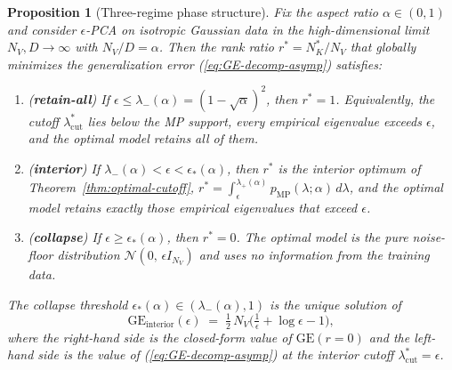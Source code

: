 \documentclass[11pt,a4paper]{article}
\newtheorem{proposition}{Proposition}
\theoremstyle{definition}
\theoremstyle{remark}
\newcommand{\NK}{N_K}
\newcommand{\NV}{N_V}
\begin{document}
\begin{proposition}[Three-regime phase structure]
\label{prop:phase}
Fix the aspect ratio $\alpha \in (0, 1)$ and consider
$\epsilon$-PCA on isotropic Gaussian data in the
high-dimensional limit $\NV, D \to \infty$ with
$\NV/D = \alpha$. Then the rank ratio
$r^{*} = \NK^{*}/\NV$ that globally minimizes the
generalization error (\ref{eq:GE-decomp-asymp}) satisfies:
\begin{enumerate}
\item[(R1)] (\textbf{retain-all}) \;
  If $\epsilon \leq \lambda_{-}(\alpha) = (1-\sqrt{\alpha})^{2}$,
  then $r^{*} = 1$. Equivalently, the cutoff
  $\lambda_{\mathrm{cut}}^{*}$ lies below the MP support, every
  empirical eigenvalue exceeds $\epsilon$, and the optimal model
  retains all of them.
\item[(R2)] (\textbf{interior}) \;
  If $\lambda_{-}(\alpha) < \epsilon < \epsilon_{*}(\alpha)$,
  then $r^{*}$ is the interior optimum of
  Theorem~\ref{thm:optimal-cutoff},
  $r^{*} = \int_{\epsilon}^{\lambda_{+}(\alpha)}
   p_{\mathrm{MP}}(\lambda;\alpha)\,d\lambda$, and the optimal
  model retains exactly those empirical eigenvalues that exceed
  $\epsilon$.
\item[(R3)] (\textbf{collapse}) \;
  If $\epsilon \geq \epsilon_{*}(\alpha)$, then $r^{*} = 0$. The
  optimal model is the pure noise-floor distribution
  $\mathcal{N}(0,\,\epsilon I_{\NV})$ and uses no information
  from the training data.
\end{enumerate}
The collapse threshold $\epsilon_{*}(\alpha) \in
(\lambda_{-}(\alpha), 1)$ is the unique solution of
\begin{equation}
  \mathrm{GE}_{\mathrm{interior}}(\epsilon)
  \;=\;
  \tfrac{1}{2}\,\NV\!\Big(\tfrac{1}{\epsilon} + \log\epsilon - 1\Big),
  \label{eq:eps-star}
\end{equation}
where the right-hand side is the closed-form value of
$\mathrm{GE}(r{=}0)$ and the left-hand side is the value of
(\ref{eq:GE-decomp-asymp}) at the interior cutoff
$\lambda_{\mathrm{cut}}^{*} = \epsilon$.
\end{proposition}
\end{document}
